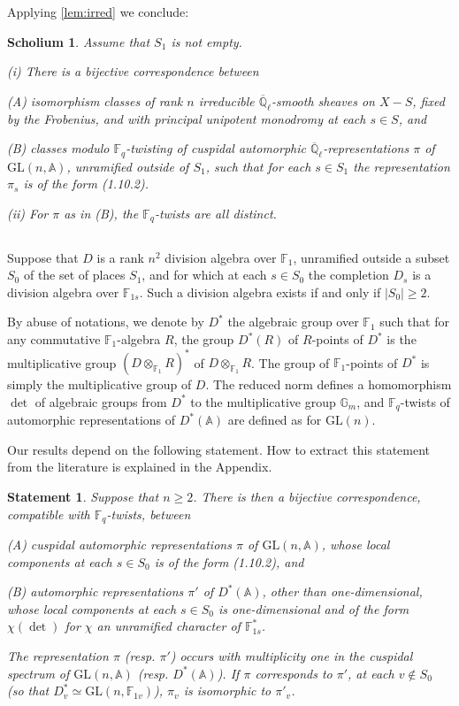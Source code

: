 \documentclass[11pt,a4paper]{article}
\theoremstyle{plain}
\newtheorem{scholium}[theorem]{Scholium}
\newtheorem{statement}[theorem]{Statement}
\theoremstyle{definition}
\newcommand{\Ql}{\overline{\mathbb{Q}}_\ell}
\newcommand{\Fq}{\mathbb{F}_q}
\newcommand{\Gm}{\mathbb{G}_m}
\newcommand{\GL}{\mathrm{GL}}
\begin{document}
Applying \ref{lem:irred} we conclude:

\begin{scholium}\label{sch:main}
Assume that $S_1$ is not empty.

\emph{(i)} There is a bijective correspondence between

(A) isomorphism classes of rank $n$ irreducible $\Ql$-smooth sheaves on $X - S$, fixed by the Frobenius, and with principal unipotent monodromy at each $s \in S$, and

(B) classes modulo $\Fq$-twisting of cuspidal automorphic $\Ql$-representations $\pi$ of $\GL(n, \mathbb{A})$, unramified outside of $S_1$, such that for each $s \in S_1$ the representation $\pi_s$ is of the form (1.10.2).

\emph{(ii)} For $\pi$ as in (B), the $\Fq$-twists are all distinct.
\end{scholium}

\subsection{}

Suppose that $D$ is a rank $n^2$ division algebra over $\mathbb{F}_1$, unramified outside a subset $S_0$ of the set of places $S_1$, and for which at each $s \in S_0$ the completion $D_s$ is a division algebra over $\mathbb{F}_{1s}$. Such a division algebra exists if and only if $|S_0| \geq 2$.

By abuse of notations, we denote by $D^*$ the algebraic group over $\mathbb{F}_1$ such that for any commutative $\mathbb{F}_1$-algebra $R$, the group $D^*(R)$ of $R$-points of $D^*$ is the multiplicative group $(D \otimes_{\mathbb{F}_1} R)^*$ of $D \otimes_{\mathbb{F}_1} R$. The group of $\mathbb{F}_1$-points of $D^*$ is simply the multiplicative group of $D$. The reduced norm defines a homomorphism $\det$ of algebraic groups from $D^*$ to the multiplicative group $\Gm$, and $\Fq$-twists of automorphic representations of $D^*(\mathbb{A})$ are defined as for $\GL(n)$.

Our results depend on the following statement. How to extract this statement from the literature is explained in the Appendix.

\begin{statement}\label{statement:main}
Suppose that $n \geq 2$. There is then a bijective correspondence, compatible with $\Fq$-twists, between

(A) cuspidal automorphic representations $\pi$ of $\GL(n, \mathbb{A})$, whose local components at each $s \in S_0$ is of the form (1.10.2), and

(B) automorphic representations $\pi'$ of $D^*(\mathbb{A})$, other than one-dimensional, whose local components at each $s \in S_0$ is one-dimensional and of the form $\chi(\det)$ for $\chi$ an unramified character of $\mathbb{F}_{1s}^*$.

The representation $\pi$ (resp. $\pi'$) occurs with multiplicity one in the cuspidal spectrum of $\GL(n, \mathbb{A})$ (resp. $D^*(\mathbb{A})$). If $\pi$ corresponds to $\pi'$, at each $v \notin S_0$ (so that $D_v^* \simeq \GL(n, \mathbb{F}_{1v})$), $\pi_v$ is isomorphic to $\pi'_v$.
\end{statement}
\end{document}
